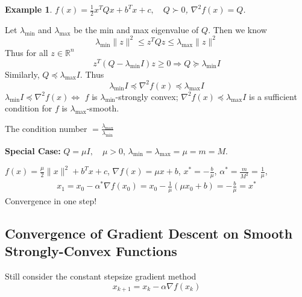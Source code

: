 \documentclass[11pt,a4paper]{article}
\newtheorem{example}{Example}
\begin{document}
\begin{example}
    $f(x)=\frac{1}{2}x^TQx+b^Tx+c,\quad Q\succ 0$, $\nabla^2 f(x)=Q$.
\end{example}
Let $\lambda_{\min}$ and $\lambda_{\max}$ be the min and max eigenvalue of $Q$. Then we know $$\lambda_{\min}\|z\|^2\leq z^TQz\leq \lambda_{\max}\|z\|^2$$
Thus for all $z\in \mathbb{R}^n$
$$z^T(Q-\lambda_{\min}I)z\geq 0 \Rightarrow	Q\succeq \lambda_{\min}I$$
Similarly, $Q\preceq \lambda_{\max}I$. Thus
$$\lambda_{\min}I\preceq \nabla^2 f(x)\preceq \lambda_{\max}I$$
$\lambda_{\min}I\preceq \nabla^2 f(x) \Leftrightarrow$ $f$ is $\lambda_{\min}$-strongly convex; $\nabla^2 f(x)\preceq \lambda_{\max}I$ is a sufficient condition for $f$ is $\lambda_{\max}$-smooth.

The condition number $=\frac{\lambda_{\max}}{\lambda_{\min}}$

\textbf{Special Case:} $Q=\mu I,\quad \mu>0$, $\lambda_{\min}=\lambda_{\max}=\mu=m=M$.

$f(x)=\frac{\mu}{2}\|x\|^2+b^Tx+c$, $\nabla f(x)=\mu x+b$, $x^*=-\frac{b}{\mu}$, $\alpha^*=\frac{m}{M^2}=\frac{1}{\mu}$,
\begin{equation}
    \begin{aligned}
        x_1=x_0-\alpha^*\nabla f(x_0)=x_0-\frac{1}{\mu}(\mu x_0+b)=-\frac{b}{\mu}=x^*
    \end{aligned}
    \nonumber
\end{equation}
Convergence in one step!

\subsection{Convergence of Gradient Descent on Smooth Strongly-Convex Functions}
Still consider the constant stepsize gradient method$$x_{k+1}=x_k-\alpha \nabla f(x_k)$$
\end{document}
